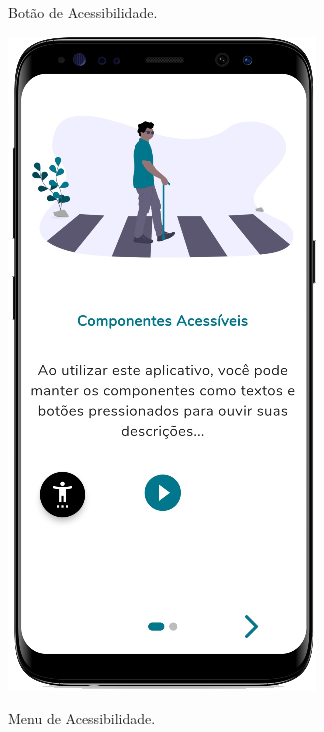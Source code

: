 \begin{figure}[htb]
    \centering
    \begin{minipage}{0.45\textwidth}
        \centering
        \caption{Botão de Acessibilidade.}\label{fig_intro_bttn_acs}
        \includegraphics[scale=0.63]{Imagens/desenvolvimento/app/intro_bttn_acs.png}
    \end{minipage}
    \hfill
    \begin{minipage}{0.45\textwidth}
        \centering
        \caption{Menu de Acessibilidade.}\label{fig_intro_menu_acs}

\end{minipage}
\end{figure}
